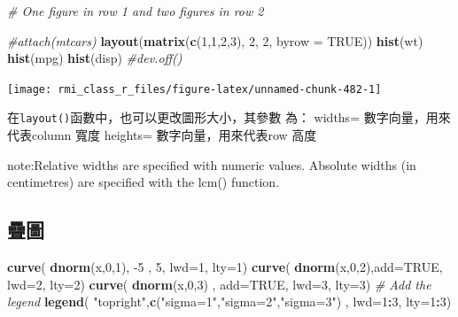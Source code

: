 \documentclass[]{book}
\newenvironment{Shaded}{\begin{snugshade}}{\end{snugshade}}
\newcommand{\CommentTok}[1]{\textcolor[rgb]{0.56,0.35,0.01}{\textit{#1}}}
\newcommand{\DataTypeTok}[1]{\textcolor[rgb]{0.13,0.29,0.53}{#1}}
\newcommand{\DecValTok}[1]{\textcolor[rgb]{0.00,0.00,0.81}{#1}}
\newcommand{\KeywordTok}[1]{\textcolor[rgb]{0.13,0.29,0.53}{\textbf{#1}}}
\newcommand{\NormalTok}[1]{#1}
\newcommand{\OperatorTok}[1]{\textcolor[rgb]{0.81,0.36,0.00}{\textbf{#1}}}
\newcommand{\OtherTok}[1]{\textcolor[rgb]{0.56,0.35,0.01}{#1}}
\newcommand{\StringTok}[1]{\textcolor[rgb]{0.31,0.60,0.02}{#1}}
\theoremstyle{definition}
\theoremstyle{definition}
\theoremstyle{definition}
\theoremstyle{remark}
\begin{document}
\begin{Shaded}
\begin{Highlighting}[]
\CommentTok{# One figure in row 1 and two figures in row 2}

\CommentTok{#attach(mtcars)}
\KeywordTok{layout}\NormalTok{(}\KeywordTok{matrix}\NormalTok{(}\KeywordTok{c}\NormalTok{(}\DecValTok{1}\NormalTok{,}\DecValTok{1}\NormalTok{,}\DecValTok{2}\NormalTok{,}\DecValTok{3}\NormalTok{), }\DecValTok{2}\NormalTok{, }\DecValTok{2}\NormalTok{, }\DataTypeTok{byrow =} \OtherTok{TRUE}\NormalTok{))}
\KeywordTok{hist}\NormalTok{(wt)}
\KeywordTok{hist}\NormalTok{(mpg)}
\KeywordTok{hist}\NormalTok{(disp)}
\CommentTok{#dev.off()}
\end{Highlighting}
\end{Shaded}

\begin{center}\texttt{[image: rmi\_class\_r\_files/figure-latex/unnamed-chunk-482-1]} \end{center}

在\texttt{layout()}函數中，也可以更改圖形大小，其參數 為： widths=
數字向量，用來代表column 寬度 heights= 數字向量，用來代表row 高度

note:Relative widths are specified with numeric values. Absolute widths
(in centimetres) are specified with the lcm() function.

\subsection{疊圖}

\begin{Shaded}
\begin{Highlighting}[]
\KeywordTok{curve}\NormalTok{( }\KeywordTok{dnorm}\NormalTok{(x,}\DecValTok{0}\NormalTok{,}\DecValTok{1}\NormalTok{), }\DecValTok{-5}\NormalTok{ , }\DecValTok{5}\NormalTok{, }\DataTypeTok{lwd=}\DecValTok{1}\NormalTok{, }\DataTypeTok{lty=}\DecValTok{1}\NormalTok{)}
\KeywordTok{curve}\NormalTok{( }\KeywordTok{dnorm}\NormalTok{(x,}\DecValTok{0}\NormalTok{,}\DecValTok{2}\NormalTok{),}\DataTypeTok{add=}\OtherTok{TRUE}\NormalTok{, }\DataTypeTok{lwd=}\DecValTok{2}\NormalTok{, }\DataTypeTok{lty=}\DecValTok{2}\NormalTok{)}
\KeywordTok{curve}\NormalTok{( }\KeywordTok{dnorm}\NormalTok{(x,}\DecValTok{0}\NormalTok{,}\DecValTok{3}\NormalTok{) , }\DataTypeTok{add=}\OtherTok{TRUE}\NormalTok{, }\DataTypeTok{lwd=}\DecValTok{3}\NormalTok{, }\DataTypeTok{lty=}\DecValTok{3}\NormalTok{)}
\CommentTok{# Add the legend}
\KeywordTok{legend}\NormalTok{( }\StringTok{"topright"}\NormalTok{,}\KeywordTok{c}\NormalTok{(}\StringTok{"sigma=1"}\NormalTok{,}\StringTok{"sigma=2"}\NormalTok{,}\StringTok{"sigma=3"}\NormalTok{) , }\DataTypeTok{lwd=}\DecValTok{1}\OperatorTok{:}\DecValTok{3}\NormalTok{, }\DataTypeTok{lty=}\DecValTok{1}\OperatorTok{:}\DecValTok{3}\NormalTok{)}
\end{Highlighting}
\end{Shaded}
\end{document}

